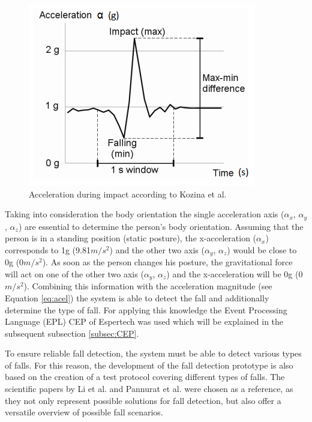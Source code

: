 \documentclass[review]{elsarticle}
\begin{document}
\begin{figure}[!ht]
	\centering
	\includegraphics[scale=1.05]{Images/KozinaImpact}
	\caption[Acceleration during impact]{Acceleration during impact according to Kozina et al. ~\cite{Kozina}}
	\label{fig:fallKozina}
\end{figure}
Taking into consideration the body orientation the single acceleration axis ($\alpha_x$, $\alpha_y$, $\alpha_z$) are essential to determine the person's body orientation. Assuming that the person is in a standing position (static posture), the x-acceleration ($\alpha_x$) corresponds to 1g (9.81$m/s^{2}$) and the other two axis ($\alpha_y$, $\alpha_z$) would be close to 0g (0$m/s^{2}$). As soon as the person changes his posture, the gravitational force will act on one of the other two axis ($\alpha_y$, $\alpha_z$) and the x-acceleration will be 0g (0$m/s^{2}$). Combining this information with the acceleration magnitude (see Equation \ref{eq:acel}) the system is able to detect the fall and additionally determine the type of fall. For applying this knowledge the Event Processing Language (EPL) CEP of Espertech \cite{Esper:2016} was used which will be explained in the subsequent subsection \ref{subsec:CEP}.

To ensure reliable fall detection, the system must be able to detect various types of falls. For this reason, the development of the fall detection prototype is also based on the creation of a test protocol covering different types of falls. The scientific papers by Li et al. \cite{Li2009} and Pannurat et al. \cite{Pannurat2014} were chosen as a reference, as they not only represent possible solutions for fall detection, but also offer a versatile overview of possible fall scenarios.
\end{document}
